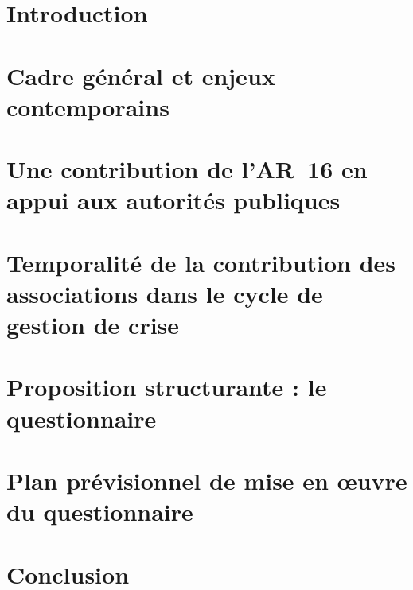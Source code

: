 \documentclass[12pt,a4paper]{article}
\newcommand{\ARSeize}{AR~16}
\begin{document}

\begingroup
\makeatletter
\renewcommand{\@pnumwidth}{3em}
\makeatother
\listoftables
\endgroup

\clearpage


\section{Introduction}



\section{Cadre général et enjeux contemporains}



\section{Une contribution de l'\ARSeize{} en appui aux autorités publiques}



\section{Temporalité de la contribution des associations dans le cycle de gestion de crise}



\section{Proposition structurante : le questionnaire}



\section{Plan prévisionnel de mise en \oe{}uvre du questionnaire}



\section{Conclusion}
\end{document}
